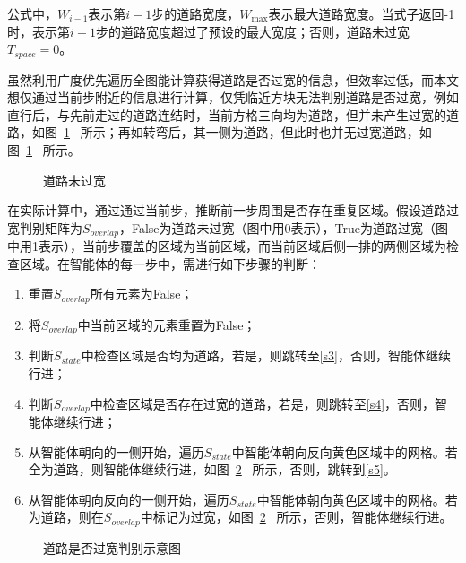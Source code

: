 公式中，$W_{i-1}$表示第$i-1$步的道路宽度，$W_{\max}$表示最大道路宽度。当式子返回-1时，表示第$i-1$步的道路宽度超过了预设的最大宽度；否则，道路未过宽$T_{space} = 0$。

虽然利用广度优先遍历全图能计算获得道路是否过宽的信息，但效率过低，而本文想仅通过当前步附近的信息进行计算，仅凭临近方块无法判别道路是否过宽，例如直行后，与先前走过的道路连结时，当前方格三向均为道路，但并未产生过宽的道路，如图~\ref{fig:no_excessive_road}~ 所示；再如转弯后，其一侧为道路，但此时也并无过宽道路，如图~\ref{fig:no_excessive_road}~ 所示。
\begin{figure}[!htb]
    \centering
    \subfigure[\label{fig:no_excessive_road_1}]{
        }\hspace{1.5cm}
    \subfigure[\label{fig:no_excessive_road_2}]{
        }
    \caption{\label{fig:no_excessive_road}道路未过宽}
\end{figure}

在实际计算中，通过通过当前步，推断前一步周围是否存在重复区域。假设道路过宽判别矩阵为$S_{overlap}$，False为道路未过宽（图中用0表示），True为道路过宽（图中用1表示），当前步覆盖的区域为当前区域，而当前区域后侧一排的两侧区域为检查区域。在智能体的每一步中，需进行如下步骤的判断：
\begin{enumerate}
    \item 重置$S_{overlap}$所有元素为False；
    \item \label{s1} 将$S_{overlap}$中当前区域的元素重置为False；
    \item 判断$S_{state}$中检查区域是否均为道路，若是，则跳转至\ref{s3}，否则，智能体继续行进；
    \item \label{s3}判断$S_{overlap}$中检查区域是否存在过宽的道路，若是，则跳转至\ref{s4}，否则，智能体继续行进；
    \item \label{s4}从智能体朝向的一侧开始，遍历$S_{state}$中智能体朝向反向黄色区域中的网格。若全为道路，则智能体继续行进，如图~\ref{fig:judege_excessive_road}~ 所示，否则，跳转到\ref{s5}。
    \item \label{s5}从智能体朝向反向的一侧开始，遍历$S_{state}$中智能体朝向黄色区域中的网格。若为道路，则在$S_{overlap}$中标记为过宽，如图~\ref{fig:judege_excessive_road}~ 所示，否则，智能体继续行进。
\end{enumerate}
\begin{figure}[!htb]
    \centering
    \subfigure[\label{fig:no_excessive_road_sig}]{
        }\hspace{10pt}
    \subfigure[\label{fig:nexcessive_road_sig}]{
        }
    \caption{\label{fig:judege_excessive_road}道路是否过宽判别示意图}
\end{figure}
